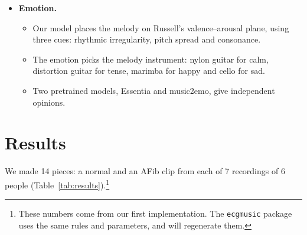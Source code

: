 \documentclass[11pt,a4paper]{article}
\begin{document}
\begin{itemize}
  \item \textbf{Emotion.}
    \begin{itemize}
      \item Our model places the melody on Russell's valence--arousal plane, using three cues:
        rhythmic irregularity, pitch spread and consonance.
      \item The emotion picks the melody instrument: nylon guitar for calm, distortion guitar for
        tense, marimba for happy and cello for sad.
      \item Two pretrained models, Essentia and music2emo, give independent opinions.
    \end{itemize}
\end{itemize}

\section{Results}
We made 14 pieces: a normal and an AFib clip from each of 7 recordings of 6 people
(Table~\ref{tab:results}).\footnote{These numbers come from our first implementation. The
\texttt{ecgmusic} package uses the same rules and parameters, and will regenerate them.}
\end{document}
